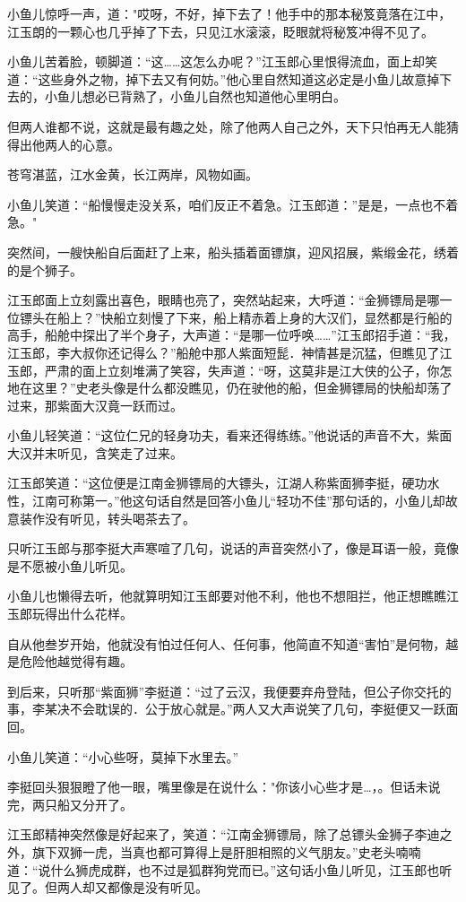 \documentclass[12pt,oneside]{book}
\begin{document}
小鱼儿惊呼一声，道："哎呀，不好，掉下去了！他手中的那本秘笈竟落在江中，江玉朗的一颗心也几乎掉了下去，只见江水滚滚，眨眼就将秘笈冲得不见了。

小鱼儿苦着脸，顿脚道：``这\ldots\ldots 这怎么办呢？''江玉郎心里恨得流血，面上却笑道：``这些身外之物，掉下去又有何妨。''他心里自然知道这必定是小鱼儿故意掉下去的，小鱼儿想必已背熟了，小鱼儿自然也知道他心里明白。

但两人谁都不说，这就是最有趣之处，除了他两人自己之外，天下只怕再无人能猜得出他两人的心意。

苍穹湛蓝，江水金黄，长江两岸，风物如画。

小鱼儿笑道：``船慢慢走没关系，咱们反正不着急。江玉郎道：''是是，一点也不着急。"

突然间，一艘快船自后面赶了上来，船头插着面镖旗，迎风招展，紫缎金花，绣着的是个狮子。

江玉郎面上立刻露出喜色，眼睛也亮了，突然站起来，大呼道：``金狮镖局是哪一位镖头在船上？''快船立刻慢了下来，船上精赤着上身的大汉们，显然都是行船的高手，船舱中探出了半个身子，大声道：``是哪一位呼唤\ldots\ldots{}''江玉郎招手道：``我，江玉郎，李大叔你还记得么？''船舱中那人紫面短髭．神情甚是沉猛，但瞧见了江玉郎，严肃的面上立刻堆满了笑容，失声道：``呀，这莫非是江大侠的公子，你怎地在这里？''史老头像是什么都没瞧见，仍在驶他的船，但金狮镖局的快船却荡了过来，那紫面大汉竟一跃而过。

小鱼儿轻笑道：``这位仁兄的轻身功夫，看来还得练练。''他说话的声音不大，紫面大汉并末听见，含笑走了过来。

江玉郎笑道：``这位便是江南金狮镖局的大镖头，江湖人称紫面狮李挺，硬功水性，江南可称第一。''他这句话自然是回答小鱼儿``轻功不佳''那句话的，小鱼儿却故意装作没有听见，转头喝茶去了。

只听江玉郎与那李挺大声寒喧了几句，说话的声音突然小了，像是耳语一般，竟像是不愿被小鱼儿听见。

小鱼儿也懒得去听，他就算明知江玉郎要对他不利，他也不想阻拦，他正想瞧瞧江玉郎玩得出什么花样。

自从他叁岁开始，他就没有怕过任何人、任何事，他简直不知道``害怕''是何物，越是危险他越觉得有趣。

到后来，只听那``紫面狮''李挺道：``过了云汉，我便要弃舟登陆，但公子你交托的事，李某决不会耽误的．公于放心就是。''两人又大声说笑了几句，李挺便又一跃面回。

小鱼儿笑道：``小心些呀，莫掉下水里去。''

李挺回头狠狠瞪了他一眼，嘴里像是在说什么："你该小心些才是\ldots，。但话未说完，两只船又分开了。

江玉郎精神突然像是好起来了，笑道：``江南金狮镖局，除了总镖头金狮子李迪之外，旗下双狮一虎，当真也都可算得上是肝胆相照的义气朋友。''史老头喃喃道：``说什么狮虎成群，也不过是狐群狗党而已。''这句话小鱼儿听见，江玉郎也听见了。但两人却又都像是没有听见。
\end{document}
